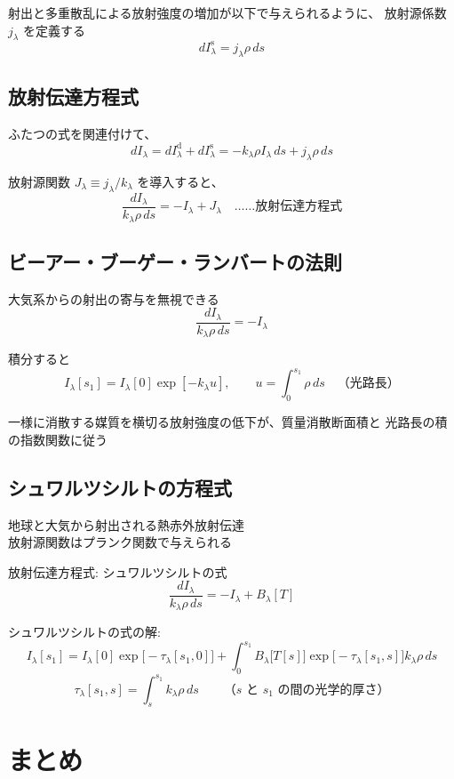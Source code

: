 \documentclass[article,nontitlepage,]{dennou777}
\begin{document}
射出と多重散乱による放射強度の増加が以下で与えられるように、
放射源係数 $j_\lambda$ を定義する
\[dI_\lambda^\mathrm{s}=j_\lambda\rho\,ds\]

\subsection{放射伝達方程式}
ふたつの式を関連付けて、
\[dI_\lambda=dI_\lambda^\mathrm{d}+dI_\lambda^\mathrm{s}=-k_\lambda\rho I_\lambda\,ds+j_\lambda\rho\,ds\]

放射源関数 $J_\lambda\equiv j_\lambda/k_\lambda$ を導入すると、
\[\frac{dI_\lambda}{k_\lambda\rho\,ds}=-I_\lambda+J_\lambda\quad\text{……放射伝達方程式}\]

\subsection{ビーアー・ブーゲー・ランバートの法則}
大気系からの射出の寄与を無視できる
\[\frac{dI_\lambda}{k_\lambda\rho\,ds}=-I_\lambda\]

積分すると
\[I_\lambda[s_1]=I_\lambda[0]\exp[-k_\lambda u],\qquad u=\int^{s_1}_0\rho\,ds\quad\text{（光路長）}\]

一様に消散する媒質を横切る放射強度の低下が、質量消散断面積と
光路長の積の指数関数に従う

\subsection{シュワルツシルトの方程式}
地球と大気から射出される熱赤外放射伝達\\
放射源関数はプランク関数で与えられる

放射伝達方程式: シュワルツシルトの式
\[\frac{dI_\lambda}{k_\lambda\rho\,ds}=-I_\lambda+B_\lambda[T]\]

シュワルツシルトの式の解:
\[I_\lambda[s_1]=I_\lambda[0]\exp\bigl[-\tau_\lambda[s_1,0]\bigr]+
	\int^{s_1}_{0}B_\lambda\bigl[T[s]\bigr]\exp\bigl[-\tau_\lambda[s_1,s]\bigr]k_\lambda\rho\,ds\]
\[\tau_\lambda[s_1,s]=\int^{s_1}_s k_\lambda\rho\,ds\qquad\text{（$s$ と $s_1$ の間の光学的厚さ）}\]

\section{まとめ}
\end{document}
